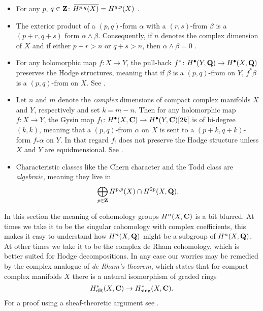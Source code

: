 \begin{itemize}[label = $\vartriangleright$ ]
    \item{For any $p$, $q \in \mathbf Z$: $\,\overline{\!{H^{p,q}(X)}} = H^{q,p}(X)$ \cite[\S II, Corollary 6.12]{Voisin2002}.}
    \item{The exterior product of a $(p,q)$-form $\alpha$ with a $(r,s)$-from $\beta$ is a $(p+r, q+s)$ form $\alpha \wedge \beta$. Consequently, if $n$ denotes the complex dimension of $X$ and if either $p+r > n$ or $q + s > n$, then $\alpha \wedge \beta = 0$ \cite[\S II, Corollary 6.15]{Voisin2002}}.
    \item{For any holomorphic map $f \colon X \to Y$, the pull-back $f^* \colon H^{\bullet}(Y, \mathbf Q) \to H^{\bullet}(X, \mathbf Q)$ preserves the Hodge structures, meaning that if $\beta$ is a $(p,q)$-from on $Y$, $f^*\beta$ is a $(p,q)$-from on $X$. See \cite[\S 7.3.2]{Voisin2002}.}
    \item{Let $n$ and $m$ denote the \emph{complex} dimensions of compact complex manifolds $X$ and $Y$, respectively and set $k = m-n$. Then for any holomorphic map $f \colon X \to Y$, the Gysin map $f_! \colon H^{\bullet}(X, \mathbf C) \to H^{\bullet}(Y, \mathbf C)[2k]$ is of bi-degree $(k,k)$, meaning that a $(p,q)$-from $\alpha$ on $X$ is sent to a $(p+k, q+k)$-form $f_*\alpha$ on $Y$. In that regard $f_!$ does not preserve the Hodge structure unless $X$ and $Y$ are equidmensional. See \cite[\S 7.3.2]{Voisin2002}.}
    \item{Characteristic classes like the Chern character and the Todd class are \emph{algebraic}, meaning they live in
    \[
        \bigoplus_{p \in \mathbf Z} H^{p,p}(X) \cap H^{2p}(X, \mathbf Q).
    \]} 
\end{itemize} 

\begin{remark}
    In this section the meaning of cohomology groups $H^{n}(X, \mathbf C)$ is a bit blurred. At times we take it to be the singular cohomology with complex coefficients, this makes it easy to understand how $H^{n}(X, \mathbf Q)$ might be a subgroup of $H^{n}(X, \mathbf Q)$. At other times we take it to be the complex de Rham cohomology, which is better suited for Hodge decompositions. In any case our worries may be remedied by the complex analogue of \emph{de Rham's theorem}, which states that for compact complex manifolds $X$ there is a natural isomorphism of graded rings
    \[
        H^*_{\operatorname{dR}}(X, \mathbf C) \to H^*_{\operatorname{sing}}(X, \mathbf C).
    \]
    For a proof using a sheaf-theoretic argument see \cite[p.\ 43--45]{GriffithsHarris1994}.
\end{remark}

